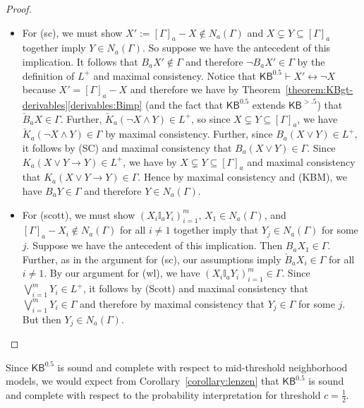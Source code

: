 \documentclass[12pt]{article}
\theoremstyle{definition}
\newcommand{\KBeq}{{\mathsf{KB}^{\mathsf{0.5}}}}       %
\newcommand{\KBgt}{{\mathsf{KB}^{\mathsf{>.5}}}}       %
\begin{document}
\begin{proof}
\begin{description}
  \end{description}

  \begin{itemize}

  \item For (sc), we must show $X':=[\Gamma]_a-X\notin N_a(\Gamma)$
    and $X\subsetneq Y\subseteq[\Gamma]_a$ together imply $Y\in
    N_a(\Gamma)$.  So suppose we have the antecedent of this
    implication.  It follows that $B_aX'\notin\Gamma$ and therefore
    $\lnot B_aX'\in\Gamma$ by the definition of $L^+$ and maximal
    consistency.  Notice that $\KBeq\vdash X'\leftrightarrow\lnot X$
    because $X'=[\Gamma]_a-X$ and therefore we have by
    Theorem~\ref{theorem:KBgt-derivables}\eqref{derivables:Bimp} (and
    the fact that $\KBeq$ extends $\KBgt$) that $\check
    B_aX\in\Gamma$.  Further, $\check K_a(\lnot X\land Y)\in L^+$, so
    since $X\subsetneq Y\subseteq[\Gamma]_a$, we have $\check
    K_a(\lnot X\land Y)\in\Gamma$ by maximal consistency.  Further,
    since $B_a(X\lor Y)\in L^+$, it follows by (SC) and maximal
    consistency that $B_a(X\lor Y)\in\Gamma$.  Since $K_a(X\lor Y\to
    Y)\in L^+$, we have by $X\subsetneq Y\subseteq[\Gamma]_a$ and
    maximal consistency that $K_a(X\lor Y\to Y)\in\Gamma$.  Hence by
    maximal consistency and (KBM), we have $B_aY\in\Gamma$ and
    therefore $Y\in N_a(\Gamma)$.

  \item For (scott), we must show $(X_i\mathbb{I}_aY_i)_{i=1}^m$,
    $X_1\in N_a(\Gamma)$, and $[\Gamma]_a-X_i\notin N_a(\Gamma)$ for
    all $i\neq 1$ together imply that $Y_j\in N_a(\Gamma)$ for some
    $j$.  Suppose we have the antecedent of this implication.  Then
    $B_aX_1\in\Gamma$.  Further, as in the argument for (sc), our
    assumptions imply $\check B_aX_i\in\Gamma$ for all $i\neq 1$.  By
    our argument for (wl), we have
    $(X_i\mathbb{I}_aY_i)_{i=1}^m\in\Gamma$.  Since
    $\bigvee_{i=1}^mY_i\in L^+$, it follows by (Scott) and maximal
    consistency that $\bigvee_{i=1}^mY_i\in\Gamma$ and therefore by
    maximal consistency that $Y_j\in\Gamma$ for some $j$.  But then
    $Y_j\in N_a(\Gamma)$.  \qedhere
  \end{itemize}
\end{proof}

Since $\KBeq$ is sound and complete with respect to mid-threshold
neighborhood models, we would expect from
Corollary~\ref{corollary:lenzen} that $\KBeq$ is sound and complete
with respect to the probability interpretation for threshold $c=\frac
12$.
\end{document}
